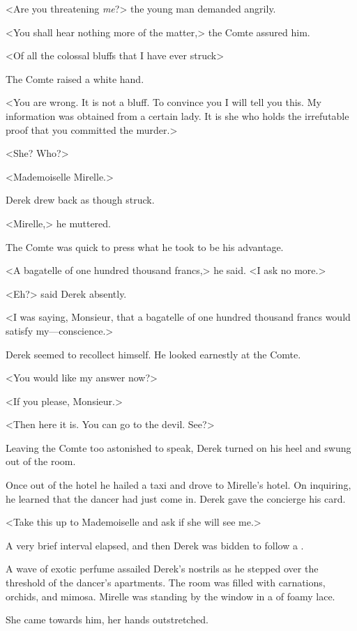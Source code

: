 <Are you threatening \emph{me}?> the young man demanded angrily.

<You shall hear nothing more of the matter,> the Comte assured him.

<Of all the colossal bluffs that I have ever struck\longdash>

The Comte raised a white hand.

<You are wrong. It is not a bluff. To convince you I will tell you this. My information was obtained from a certain lady. It is she who holds the irrefutable proof that you committed the murder.>

<She? Who?>

<Mademoiselle Mirelle.>

Derek drew back as though struck.

<Mirelle,> he muttered.

The Comte was quick to press what he took to be his advantage.

<A bagatelle of one hundred thousand francs,> he said. <I ask no more.>

<Eh?> said Derek absently.

<I was saying, Monsieur, that a bagatelle of one hundred thousand francs would satisfy my—conscience.>

Derek seemed to recollect himself. He looked earnestly at the Comte.

<You would like my answer now?>

<If you please, Monsieur.>

<Then here it is. You can go to the devil. See?>

Leaving the Comte too astonished to speak, Derek turned on his heel and swung out of the room.

Once out of the hotel he hailed a taxi and drove to Mirelle's hotel. On inquiring, he learned that the dancer had just come in. Derek gave the concierge his card.

<Take this up to Mademoiselle and ask if she will see me.>

A very brief interval elapsed, and then Derek was bidden to follow a .

A wave of exotic perfume assailed Derek's nostrils as he stepped over the threshold of the dancer's apartments. The room was filled with carnations, orchids, and mimosa. Mirelle was standing by the window in a  of foamy lace.

She came towards him, her hands outstretched.


